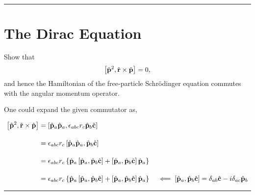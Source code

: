 
\noindent\rule{7in}{2.8pt}
\section{The Dirac Equation}
    
\begin{problem}{4.1}
Show that
\begin{align*}
    \left[ \hat{\mathbf{p}}^2,\hat{\mathbf{r}}\times \hat{\mathbf{p}}\right]=0,
\end{align*}
and hence the Hamiltonian of the free-particle Schrödinger equation commutes with the angular momentum operator.
\end{problem}
\begin{solution}
One could expand the given commutator as, 

\begin{align*}
    \left[ \hat{\mathbf{p}}^2 , \hat{\mathbf{r}} \times \hat{\mathbf{p}} \right] &=  \left[ \hat{\mathbf{p}}_a\hat{\mathbf{p}}_a,\epsilon_{abc}r_c \hat{\mathbf{p}}_b \hat{\mathbf{c}} \right]\\[0.15in]
        &= \epsilon_{abc}r_c \left[ \hat{\mathbf{p}}_a\hat{\mathbf{p}}_a,\hat{\mathbf{p}}_b \hat{\mathbf{c}} \right]\\[0.15in]
        &= \epsilon_{abc}r_c \left\{ \hat{\mathbf{p}}_a \left[ \hat{\mathbf{p}}_a,\hat{\mathbf{p}}_b \hat{\mathbf{c}} \right] + \left[ \hat{\mathbf{p}}_a,\hat{\mathbf{p}}_b \hat{\mathbf{c}} \right] \hat{\mathbf{p}}_a  \right\} \\[0.15in]
        &= \epsilon_{abc}r_c \left\{ \hat{\mathbf{p}}_a \left[ \hat{\mathbf{p}}_a,\hat{\mathbf{p}}_b \hat{\mathbf{c}} \right] + \left[ \hat{\mathbf{p}}_a,\hat{\mathbf{p}}_b \hat{\mathbf{c}} \right] \hat{\mathbf{p}}_a  \right\} \quad \impliedby  \left[ \hat{\mathbf{p}}_a,\hat{\mathbf{p}}_b \hat{\mathbf{c}} \right] = \delta_{ab} \hat{\mathbf{c}} - i \delta_{ac} \hat{\mathbf{p}}_b
\end{align*}
\end{solution}

\noindent\rule{7in}{1.5pt}


